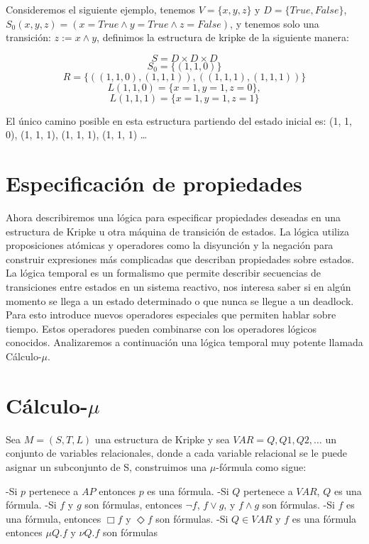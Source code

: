 Consideremos el siguiente ejemplo, tenemos $V = \{x,y,z\}$ y $D = \{True, False\}$, $S_{0} (x,y,z) = (x= True \land y = True \land z = False)$, y tenemos solo una transición: $z := x \land y$, definimos la estructura de kripke de la siguiente manera:

\[S = D \times D \times D\]
\[S_{0} = \{(1, 1, 0)\}\]
\[R = \{((1, 1, 0), (1, 1, 1)), ((1, 1, 1), (1, 1, 1))\}\]
\[L (1, 1, 0) = \{x = 1, y = 1, z = 0\},\]
\[L (1, 1, 1) = \{x = 1, y = 1, z = 1\}\]

El único camino posible en esta estructura partiendo del estado inicial es: (1, 1, 0), (1, 1, 1), (1, 1, 1), (1, 1, 1) …

\section{Especificación de propiedades}

Ahora describiremos una lógica para especificar propiedades deseadas en una estructura de Kripke u otra máquina de transición de estados. La lógica utiliza proposiciones atómicas y operadores como la disyunción y la negación para construir expresiones más complicadas que describan propiedades sobre estados.
La lógica temporal es un formalismo que permite describir secuencias de transiciones entre estados en un sistema reactivo, nos interesa saber si en algún momento se llega a un estado determinado o que nunca se llegue a un deadlock. Para esto introduce nuevos operadores especiales que permiten hablar sobre tiempo. Estos operadores pueden combinarse con los operadores lógicos conocidos.
Analizaremos a continuación una lógica temporal muy potente llamada Cálculo-$\mu$.


\section{Cálculo-$\mu$}

Sea $M = (S, T, L)$ una estructura de Kripke y sea $VAR = {Q, Q1, Q2, …}$ un conjunto de variables relacionales, donde a cada variable relacional se le puede asignar un subconjunto de S, construimos una $\mu$-fórmula como sigue:

-Si $p$ pertenece a $AP$ entonces $p$ es una fórmula.
-Si $Q$ pertenece a $VAR$, $Q$ es una fórmula.
-Si $f$ y $g$ son fórmulas, entonces $\neg f$, $f \lor g$, y $f \land g$ son fórmulas.
-Si $f$ es una fórmula, entonces $\Box f$ y $\Diamond f$ son fórmulas.
-Si $Q \in VAR$ y $f$ es una fórmula entonces $\mu Q.f$ y $\nu Q.f$ son fórmulas


